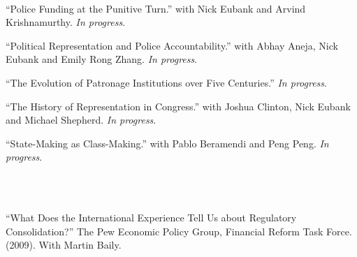 \documentclass[11pt]{article}
\begin{document}
	\vspace{.2in}
	\begin{minipage}[t]{.21\textwidth}
		\so{ } \\
	\end{minipage}
	\begin{minipage}[t]{.79\textwidth}
		``Police Funding at the Punitive Turn.'' with Nick Eubank and Arvind Krishnamurthy. \emph{In progress}.\\
		\vspace{-.05in}

		``Political Representation and Police Accountability.'' with Abhay Aneja, Nick Eubank and Emily Rong Zhang. \emph{In progress}. \\
		\vspace{-.05in}


	``The Evolution of Patronage Institutions over Five Centuries.'' \emph{In progress}. \\
	\vspace{-.05in}

	``The History of Representation in Congress.'' with Joshua Clinton, Nick Eubank and Michael Shepherd. \emph{In progress}. \\
	\vspace{-.05in}

	``State-Making as Class-Making.'' with Pablo Beramendi and Peng Peng.  \emph{In progress}. \\
\end{minipage}




\vspace{.3in}
\begin{minipage}[t]{.21\textwidth}
	 \\
	 \\
\end{minipage}
\begin{minipage}[t]{.79\textwidth}
	``What Does the International Experience Tell Us about Regulatory Consolidation?'' The Pew Economic Policy Group,
Financial Reform Task Force. (2009). With Martin Baily. \\
\end{minipage}







\end{document}
